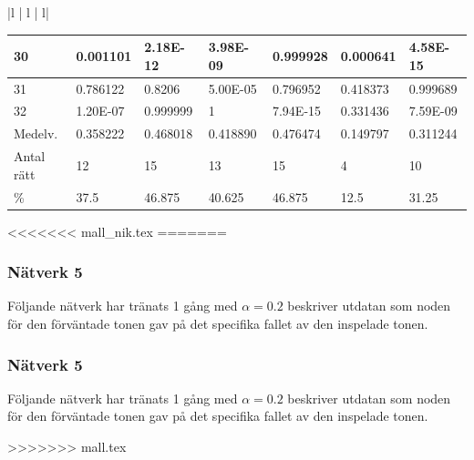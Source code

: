 \documentclass[a4paper,10pt]{article}
\begin{document}
{\begin{tabular}{ |l | l | l| }
\begin{centering}
{\begin{tabular}{ |l|l|l|l|l|l|l| }
30	       & 0.001101 & 2.18E-12 & 3.98E-09 & 0.999928 & 0.000641 & 4.58E-15 \\ \hline               
31	       & 0.786122 & 0.8206   & 5.00E-05 & 0.796952 & 0.418373 & 0.999689 \\ \hline             
32	       & 1.20E-07 & 0.999999 & 1        & 7.94E-15 & 0.331436 & 7.59E-09 \\ \hline\hline      
Medelv.    & 0.358222 & 0.468018 & 0.418890 & 0.476474 & 0.149797 & 0.311244 \\ \hline  
Antal rätt & 12       & 15       & 13       & 15       & 4        & 10        \\ \hline
\%		   & 37.5     & 46.875   & 40.625   & 46.875   & 12.5     & 31.25     \\ \hline
\end{tabular}

}

<<<<<<< mall_nik.tex
=======
\subsubsection{Nätverk 5}
Följande nätverk har tränats 1 gång med $\alpha=0.2$ beskriver utdatan som noden för den förväntade tonen gav på det specifika fallet av den inspelade tonen.

\subsubsection{Nätverk 5}
Följande nätverk har tränats 1 gång med $\alpha=0.2$ beskriver utdatan som noden för den förväntade tonen gav på det specifika fallet av den inspelade tonen.

\begin{centering}
>>>>>>> mall.tex

\end{centering}
\end{centering}
\end{tabular}}
\end{document}
